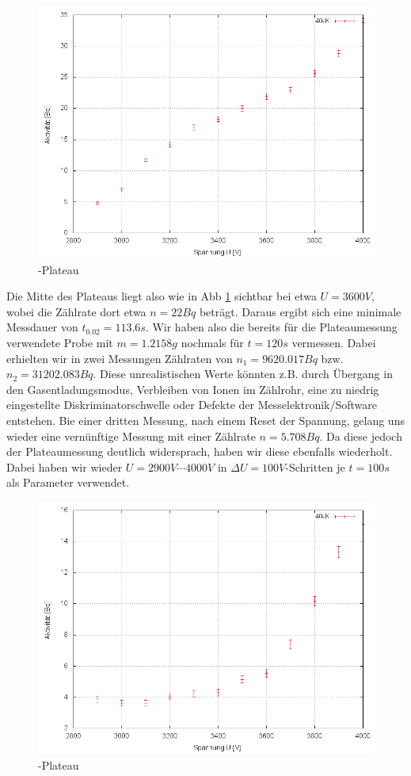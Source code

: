 \begin{figure}[H]
 \centering \includegraphics[width = 0.99\linewidth]{Messwerte/plots/K40_plateau.png}
 \caption{-Plateau}
 \label{k40plateau}
\end{figure}

Die Mitte des Plateaus liegt also wie in Abb \ref{k40plateau} sichtbar bei etwa $U = 3600V$, wobei die Zählrate dort etwa $n = 22 Bq$ beträgt. Daraus ergibt sich eine minimale Messdauer von $t_{0.02} = 113.6 s$. Wir haben also die bereits für die Plateaumessung verwendete Probe mit $m = 1.2158g$ nochmals für $t = 120s$ vermessen. Dabei erhielten wir in zwei Messungen Zählraten von $n_1 = 9620.017 Bq$ bzw. $n_2 = 31 202.083 Bq$. Diese unrealistischen Werte könnten z.B. durch Übergang in den Gasentladungsmodus, Verbleiben von Ionen im Zählrohr, eine zu niedrig eingestellte Diskriminatorschwelle oder Defekte der Messelektronik/Software entstehen. Bie einer dritten Messung, nach einem Reset der Spannung, gelang uns wieder eine vernünftige Messung mit einer Zählrate $n = 5.708 Bq$. Da diese jedoch der Plateaumessung deutlich widersprach, haben wir diese ebenfalls wiederholt. Dabei haben wir wieder $U = 2900V \cdots 4000V$ in $\Delta U = 100 V$-Schritten je $t=100s$ als Parameter verwendet. 


\begin{figure}[H]
 \centering \includegraphics[width = 0.99\linewidth]{Messwerte/plots/K40_plateau2.png}
 \caption{-Plateau}
\end{figure}
